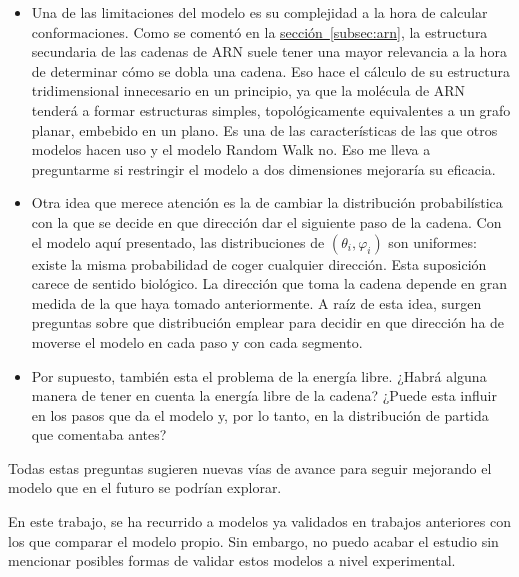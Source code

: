 \documentclass[a4paper,11pt,titlepage]{article}
\newcommand{\nr}[2][sección]{\hyperref[#2]{#1~\ref{#2}}}
\renewcommand{\phi}{\varphi}
\theoremstyle{definition}
\begin{document}
\begin{itemize}
    \item Una de las limitaciones del modelo es su complejidad a la hora de calcular conformaciones. Como se comentó en la \nr[sección]{subsec:arn}, la estructura secundaria de las cadenas de ARN suele tener una mayor relevancia a la hora de determinar cómo se dobla una cadena. Eso hace el cálculo de su estructura tridimensional innecesario en un principio, ya que la molécula de ARN tenderá a formar estructuras simples, topológicamente equivalentes a un grafo planar, embebido en un plano. Es una de las características de las que otros modelos hacen uso y el modelo Random Walk no. Eso me lleva a preguntarme si restringir el modelo a dos dimensiones mejoraría su eficacia.
    \item Otra idea que merece atención es la de cambiar la distribución probabilística con la que se decide en que dirección dar el siguiente paso de la cadena. Con el modelo aquí presentado, las distribuciones de $(\theta_i, \phi_i)$ son uniformes: existe la misma probabilidad de coger cualquier dirección. Esta suposición carece de sentido biológico. La dirección que toma la cadena depende en gran medida de la que haya tomado anteriormente. A raíz de esta idea, surgen preguntas sobre que distribución emplear para decidir en que dirección ha de moverse el modelo en cada paso y con cada segmento.
    \item Por supuesto, también esta el problema de la energía libre. ¿Habrá alguna manera de tener en cuenta la energía libre de la cadena? ¿Puede esta influir en los pasos que da el modelo y, por lo tanto, en la distribución de partida que comentaba antes?
\end{itemize}

Todas estas preguntas sugieren nuevas vías de avance para seguir mejorando el modelo que en el futuro se podrían explorar.

En este trabajo, se ha recurrido a modelos ya validados en trabajos anteriores con los que comparar el modelo propio. Sin embargo, no puedo acabar el estudio sin mencionar posibles formas de validar estos modelos a nivel experimental.
\end{document}
